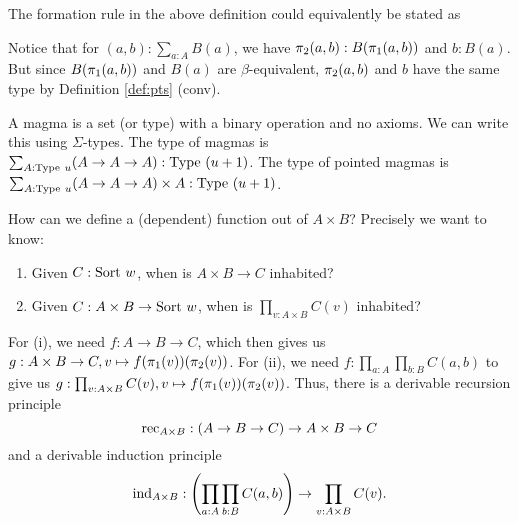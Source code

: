 \begin{rem}
    The formation rule in the above definition could equivalently be stated as 
    \begin{prooftree}
    \end{prooftree}
\end{rem}

\begin{rem}
    Notice that for $(a, b) : \sum_{a : A} B(a)$, we have $\piproj{2}{a, b} : B(\piproj{1}{a, b})$ and $b : B(a)$. 
    But since $B(\piproj{1}{a, b})$ and $B(a)$ are $\beta$-equivalent, $\piproj{2}{a, b}$ and $b$ have the same type by Definition \ref{def:pts} (conv).
\end{rem}

\begin{example}
    A \alert{magma} is a set (or type) with a binary operation and no axioms.
    We can write this using $\Sigma$-types. 
    The type of magmas is $\sum_{A : \typeu{u}} (A \to A \to A) : \typeu{(u + 1)}$. 
    The type of pointed magmas is $\sum_{A : \typeu{u}} (A \to A \to A) \times A : \typeu{(u + 1)}$.
\end{example}

\begin{rem}
    How can we define a (dependent) function out of $A \times B$?
    Precisely we want to know:
    \begin{enumerate}
        \item Given $C : \sortu{w}$, when is $A \times B \to C$ inhabited?
        \item Given $C : A \times B \to \sortu{w}$, when is $\prod_{v : A \times B} C(v)$ inhabited?
    \end{enumerate} 
    For (i), we need $f : A \to B \to C$, which then gives us $g : A \times B \to C, v \mapsto f(\piproj{1}{v})(\piproj{2}{v})$. 
    For (ii), we need $f : \prod_{a : A}\prod_{b : B}C(a, b)$ to give us $g : \prod_{v : A \times B} C(v), v \mapsto f(\piproj{1}{v})(\piproj{2}{v})$.
    Thus, there is a derivable recursion principle 
    \begin{equation*}
        \rec{A \times B} : (A \to B \to C) \to A \times B \to C
    \end{equation*}
    and a derivable induction principle
    \begin{equation*}
        \ind{A \times B} : \left(\prod_{a : A}\prod_{b : B}C(a, b)\right) \to \prod_{v : A \times B} C(v).
    \end{equation*}
\end{rem}

